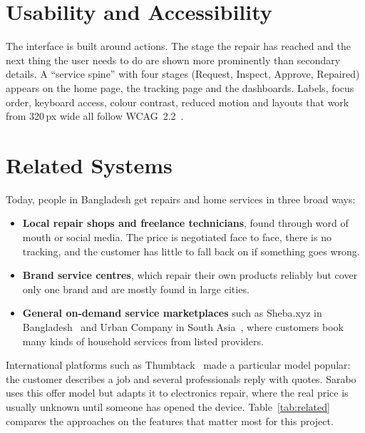 \documentclass{standalone}
\begin{document}
\section{Usability and Accessibility}
The interface is built around actions. The stage the repair has reached and the next thing the user needs to do are shown more prominently than secondary details. A ``service spine'' with four stages (Request, Inspect, Approve, Repaired) appears on the home page, the tracking page and the dashboards. Labels, focus order, keyboard access, colour contrast, reduced motion and layouts that work from 320\,px wide all follow WCAG~2.2~\cite{wcag22}.

\section{Related Systems}
Today, people in Bangladesh get repairs and home services in three broad ways:
\begin{itemize}
  \item \textbf{Local repair shops and freelance technicians}, found through word of mouth or social media. The price is negotiated face to face, there is no tracking, and the customer has little to fall back on if something goes wrong.
  \item \textbf{Brand service centres}, which repair their own products reliably but cover only one brand and are mostly found in large cities.
  \item \textbf{General on-demand service marketplaces} such as Sheba.xyz in Bangladesh~\cite{sheba} and Urban Company in South Asia~\cite{urbancompany}, where customers book many kinds of household services from listed providers.
\end{itemize}

International platforms such as Thumbtack~\cite{thumbtack} made a particular model popular: the customer describes a job and several professionals reply with quotes. Sarabo uses this offer model but adapts it to electronics repair, where the real price is usually unknown until someone has opened the device. Table~\ref{tab:related} compares the approaches on the features that matter most for this project.
\end{document}
